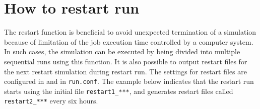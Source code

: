 \section{How to restart run}\label{sec:restart}
The restart function is beneficial to avoid unexpected termination of a simulation because of limitation of the job execution time controlled by a computer system.
In such cases, the simulation can be executed by being divided into multiple sequential runs using this function.
It is also possible to output restart files for the next restart simulation during restart run.
The settings for restart files are configured in  and  in \verb|run.conf|.
The example below indicates that the restart run starts using the initial file \verb|restart1_***|, and generates restart files called \verb|restart2_***| every six hours.
